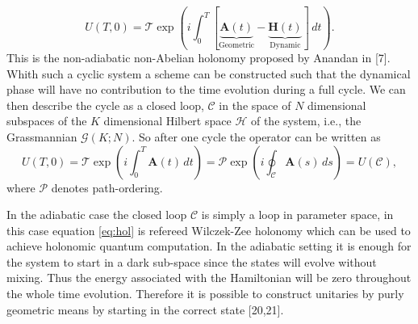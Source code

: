 \begin{equation}
\label{eq:unitary}
U(T,0) = \mathcal{T}\exp\left(i\int_{0}^{T} \left[\underbrace{\mathbf{A}(t)}_{\text{Geometric}} - \underbrace{\mathbf{H}(t)}_{\text{Dynamic}}\right]\,dt\right).
\end{equation}
This is the non-adiabatic non-Abelian holonomy proposed by Anandan in [7]. Whith such a cyclic system a scheme can be constructed such that the dynamical phase will have no contribution to the time evolution during a full cycle. We can then describe the cycle as a closed loop, $\mathcal{C}$ in the space of $N$ dimensional subspaces of the $K$ dimensional Hilbert space $\mathcal{H}$ of the system, i.e., the Grassmannian $\mathcal{G}(K;N)$. So after one cycle the operator can be written as
\begin{equation}
U(T,0) = \mathcal{T}\exp\left(i\int_{0}^{T}\mathbf{A}(t)\,dt\right) = \mathcal{P}\exp\left(i\oint_{\mathcal{C}}\mathbf{A}(s)\,ds\right) = U(\mathcal{C}),
\label{eq:hol}
\end{equation}
where $\mathcal{P}$ denotes path-ordering. 

In the adiabatic case the closed loop $\mathcal{C}$ is simply a loop in parameter space, in this case equation \ref{eq:hol} is refereed Wilczek-Zee holonomy which can be used to achieve holonomic quantum computation. In the adiabatic setting it is enough for the system to start in a dark sub-space since the states will evolve without mixing. Thus the energy associated with the Hamiltonian will be zero throughout the whole time evolution. Therefore it is possible to construct unitaries by purly geometric means by starting in the correct state [20,21].

